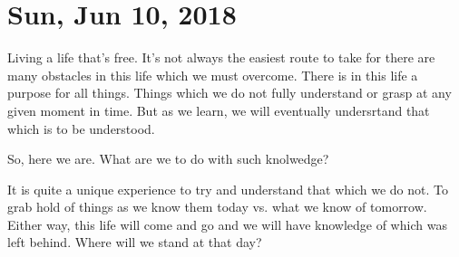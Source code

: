 \section{Sun, Jun 10, 2018}

Living a life that's free. It's not always the easiest route to take for there
are many obstacles in this life which we must overcome. There is in this life a
purpose for all things. Things which we do not fully understand or grasp at any
given moment in time. But as we learn, we will eventually undersrtand that which
is to be understood.

So, here we are. What are we to do with such knolwedge?

It is quite a unique experience to try and understand that which we do not. To
grab hold of things as we know them today vs. what we know of tomorrow. Either
way, this life will come and go and we will have knowledge of which was left
behind. Where will we stand at that day?
